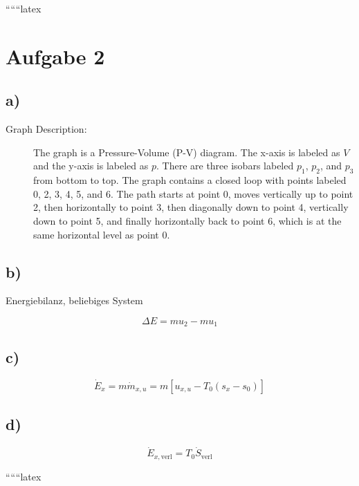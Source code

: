 
``````latex


\section*{Aufgabe 2}

\subsection*{a)}

\begin{description}
    \item[Graph Description:] The graph is a Pressure-Volume (P-V) diagram. The x-axis is labeled as \( V \) and the y-axis is labeled as \( p \). There are three isobars labeled \( p_1 \), \( p_2 \), and \( p_3 \) from bottom to top. The graph contains a closed loop with points labeled 0, 2, 3, 4, 5, and 6. The path starts at point 0, moves vertically up to point 2, then horizontally to point 3, then diagonally down to point 4, vertically down to point 5, and finally horizontally back to point 6, which is at the same horizontal level as point 0.
\end{description}

\subsection*{b)}

Energiebilanz, beliebiges System

\[
\Delta E = m u_{2} - m u_{1}
\]

\subsection*{c)}

\[
\dot{E}_{x} = m \dot{m}_{x,u} = m \left[ u_{x,u} - T_{0} (s_{x} - s_{0}) \right]
\]

\subsection*{d)}

\[
\dot{E}_{x, \text{verl}} = T_{0} \dot{S}_{\text{verl}}
\]

``````latex



